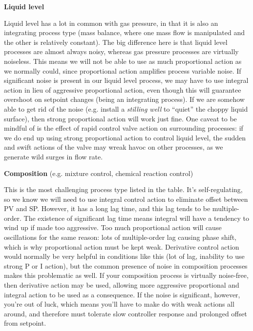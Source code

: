 \vskip 20pt

\noindent
{\bf Liquid level}

Liquid level has a lot in common with gas pressure, in that it is also an integrating process type (mass balance, where one mass flow is manipulated and the other is relatively constant).  The big difference here is that liquid level processes are almost always noisy, whereas gas pressure processes are virtually noiseless.  This means we will not be able to use as much proportional action as we normally could, since proportional action amplifies process variable noise.  If significant noise is present in our liquid level process, we may have to use integral action in lieu of aggressive proportional action, even though this will guarantee overshoot on setpoint changes (being an integrating process).  If we are somehow able to get rid of the noise (e.g. install a {\it stilling well} to ``quiet'' the choppy liquid surface), then strong proportional action will work just fine.  One caveat to be mindful of is the effect of rapid control valve action on surrounding processes: if we do end up using strong proportional action to control liquid level, the sudden and swift actions of the valve may wreak havoc on other processes, as we generate wild surges in flow rate.

\vskip 20pt

\noindent
{\bf Composition} (e.g. mixture control, chemical reaction control)

This is the most challenging process type listed in the table.  It's self-regulating, so we know we will need to use integral control action to eliminate offset between PV and SP.  However, it has a long lag time, and this lag tends to be multiple-order.  The existence of significant lag time means integral will have a tendency to wind up if made too aggressive.  Too much proportional action will cause oscillations for the same reason: lots of multiple-order lag causing phase shift, which is why proportional action must be kept weak.  Derivative control action would normally be very helpful in conditions like this (lot of lag, inability to use strong P or I action), but the common presence of noise in composition processes makes this problematic as well.  If your composition process is virtually noise-free, then derivative action may be used, allowing more aggressive proportional and integral action to be used as a consequence.  If the noise is significant, however, you're out of luck, which means you'll have to make do with weak actions all around, and therefore must tolerate slow controller response and prolonged offset from setpoint.

